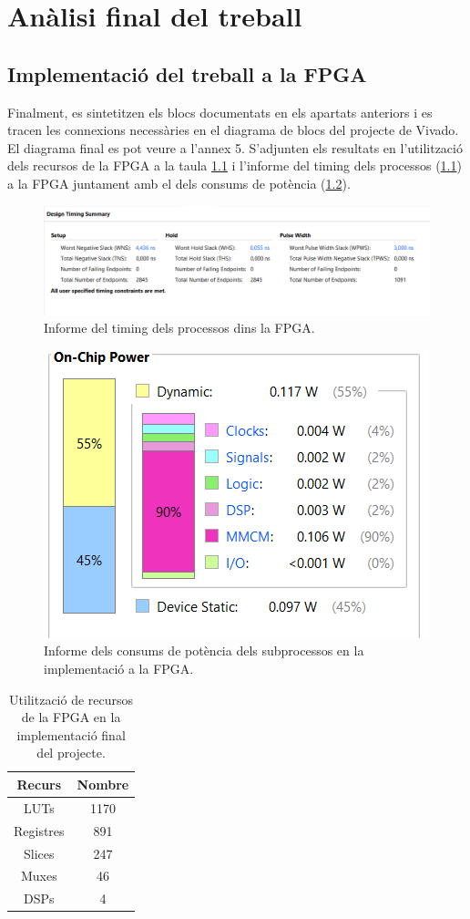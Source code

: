 \chapter{Anàlisi final del treball}
\section{Implementació del treball a la FPGA}
\par Finalment, es sintetitzen els blocs documentats en els apartats anteriors i es tracen les connexions necessàries en el diagrama de blocs del projecte de Vivado. El diagrama final es pot veure a l'annex 5. S'adjunten els resultats en l'utilització dels recursos de la FPGA a la taula \ref{taula_recursosFPGA} i l'informe del timing dels processos (\ref{figTiming}) a la FPGA juntament amb el dels consums de potència (\ref{figPWR}).
\begin{figure}[H]
    \centering
    \includegraphics[width=0.6\linewidth]{Images/Timingreport.png}
    \caption{Informe del timing dels processos dins la FPGA.}
    \label{figTiming}
\end{figure}
\begin{figure}[H]
    \centering
    \includegraphics[width=0.4\linewidth]{Images/PWR_FPGA.png}
    \caption{Informe dels consums de potència dels subprocessos en la implementació a la FPGA.}
    \label{figPWR}
\end{figure}
\begin{table}
    \centering
    \begin{tabular}{ | c | c | }
    \hline
    \textbf{Recurs}     &  \textbf{Nombre}\\ [2ex] 
    \hline
    LUTs     &  1170\\
    \hline
    Registres     &  891\\
    \hline
    Slices     &  247\\
    \hline
    Muxes     &  46\\
    \hline
    DSPs     &  4\\
    \hline
    \end{tabular}
    \caption{Utilització de recursos de la FPGA en la implementació final del projecte.}
    \label{taula_recursosFPGA}
\end{table}

